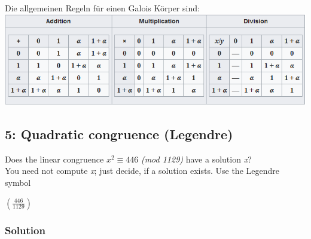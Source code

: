 \documentclass[11pt]{article}
\begin{document}
Die allgemeinen Regeln für einen Galois Körper sind: \\
\includegraphics{img/galois_regeln.png}

\newpage

    \hypertarget{quadratic-congruence-legendre}{%
\subsection{5: Quadratic congruence
(Legendre)}\label{quadratic-congruence-legendre}}

Does the linear congruence \(x^{2} \equiv 446\) \emph{(mod 1129)} have a
solution \emph{x}?\\
You need not compute \emph{x}; just decide, if a solution exists. Use
the Legendre symbol

\((\frac{446}{1129})\)

\hypertarget{solution}{%
\subsubsection{Solution}\label{solution}}
\end{document}
